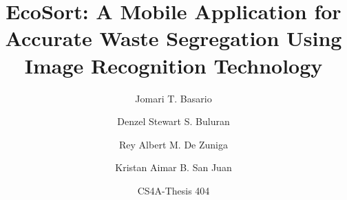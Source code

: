 \documentclass[english,12pt,letterpaper]{article}
\title{EcoSort: A Mobile Application for Accurate Waste Segregation Using Image Recognition Technology}
\author{
	Jomari T. Basario \and 
	Denzel Stewart S. Buluran \and 
	Rey Albert M. De Zuniga \and
	Kristan Aimar B. San Juan
}
\date{CS4A-Thesis 404}
\begin{document}
	\maketitle
	
	
	
	
	
	
	
	\nocite{recycleguide2024}
	\printbibliography
\end{document}
